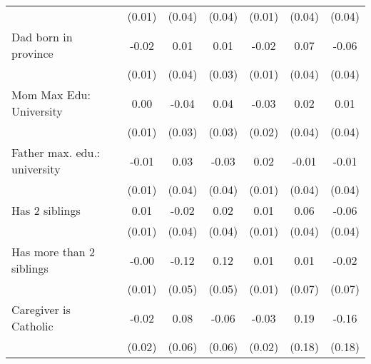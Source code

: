 {\begin{tabular}{l*{6}{c}}
                    &      (0.01)         &      (0.04)         &      (0.04)         &      (0.01)         &      (0.04)         &      (0.04)         \\
\addlinespace
Dad born in province&       -0.02         &        0.01         &        0.01         &       -0.02         &        0.07\sym{*}  &       -0.06         \\
                    &      (0.01)         &      (0.04)         &      (0.03)         &      (0.01)         &      (0.04)         &      (0.04)         \\
\addlinespace
Mom Max Edu: University&        0.00         &       -0.04         &        0.04         &       -0.03         &        0.02         &        0.01         \\
                    &      (0.01)         &      (0.03)         &      (0.03)         &      (0.02)         &      (0.04)         &      (0.04)         \\
\addlinespace
Father max. edu.: university&       -0.01         &        0.03         &       -0.03         &        0.02         &       -0.01         &       -0.01         \\
                    &      (0.01)         &      (0.04)         &      (0.04)         &      (0.01)         &      (0.04)         &      (0.04)         \\
\addlinespace
Has 2 siblings      &        0.01         &       -0.02         &        0.02         &        0.01         &        0.06         &       -0.06         \\
                    &      (0.01)         &      (0.04)         &      (0.04)         &      (0.01)         &      (0.04)         &      (0.04)         \\
\addlinespace
Has more than 2 siblings&       -0.00         &       -0.12\sym{*}  &        0.12\sym{*}  &        0.01         &        0.01         &       -0.02         \\
                    &      (0.01)         &      (0.05)         &      (0.05)         &      (0.01)         &      (0.07)         &      (0.07)         \\
\addlinespace
Caregiver is Catholic&       -0.02         &        0.08         &       -0.06         &       -0.03         &        0.19         &       -0.16         \\
                    &      (0.02)         &      (0.06)         &      (0.06)         &      (0.02)         &      (0.18)         &      (0.18)         \\

\end{tabular}}

